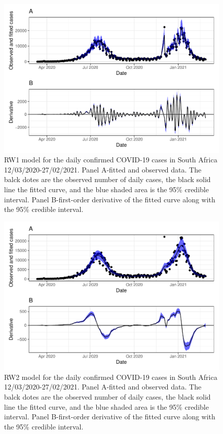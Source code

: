 \documentclass[10pt,letterpaper]{article}
\begin{document}
\begin{figure}[h]
\includegraphics[width=0.99\linewidth]{COVIDincidenceSA_files/figure-latex/unnamed-chunk-14-1} \caption{RW1 model for the daily confirmed COVID-19 cases in South Africa 12/03/2020-27/02/2021.  Panel A-fitted and observed data. The balck dotes are the observed number of daily cases, the black solid line the fitted curve, and the blue shaded area is the 95\% credible interval. Panel B-first-order derivative of the fitted curve along with the 95\% credible interval.}\label{fig:rw1fitted}
\end{figure}

\begin{figure}[h]
	\includegraphics[width=0.95\linewidth]{COVIDincidenceSA_files/figure-latex/unnamed-chunk-7-1} \caption{RW2 model for the daily confirmed COVID-19 cases in South Africa 12/03/2020-27/02/2021.  Panel A-fitted and observed data. The balck dotes are the observed number of daily cases, the black solid line the fitted curve, and the blue shaded area is the 95\% credible interval. Panel B-first-order derivative of the fitted curve along with the 95\% credible interval.}\label{fig:rw2fitted}
\end{figure}
\end{document}

